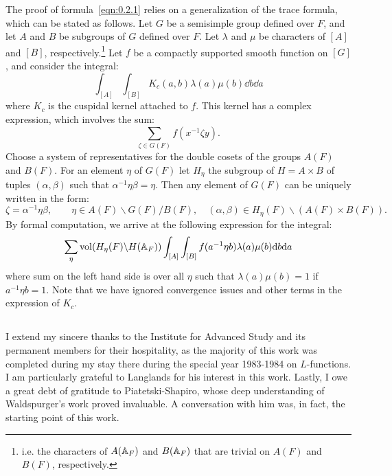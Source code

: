 The proof of formula~\eqref{eqn:0.2.1} relies on a generalization of the trace formula, which can be stated as follows.
Let $G$ be a semisimple group defined over $F$, and let $A$ and $B$ be subgroups of $G$ defined over $F$.
Let $\lambda$ and $\mu$ be characters of $[A]$ and $[B]$, respectively.\footnote{i.e. the characters of $A(\mathbb{A}_F)$ and $B(\mathbb{A}_F)$ that are trivial on $A(F)$ and $B(F)$, respectively.}
Let $f$ be a compactly supported smooth function on $[G]$, and consider the integral:
\[
\int_{[A]} \int_{[B]} K_c(a, b) \lambda(a) \mu(b) \dd b \dd a
\]
where $K_c$ is the cuspidal kernel attached to $f$.
This kernel has a complex expression, which involves the sum:
\[
\sum_{\zeta \in G(F)} f(x^{-1} \zeta y).
\]
Choose a system of representatives for the double cosets of the groups $A(F)$ and $B(F)$.
For an element $\eta$  of $G(F)$ let $H_\eta$ the subgroup of $H = A\times B$ of tuples $(\alpha, \beta)$ such that $\alpha^{-1} \eta \beta = \eta$.
Then any element of $G(F)$ can be uniquely written in the form:
\[
\zeta = \alpha^{-1} \eta \beta, \qquad \eta \in A(F) \backslash G(F) / B(F), \quad (\alpha, \beta) \in H_{\eta}(F) \backslash (A(F) \times B(F)).
\]
By formal computation, we arrive at the following expression for the integral:
\[
\sum_{\eta} \mathrm{vol}(H_{\eta}(F) \backslash H(\mathbb{A}_F)) \int_{[A]} \int_{[B]} f(a^{-1} \eta b) \lambda(a) \mu(b) \mathrm{d} b \mathrm{d} a
\]
where sum on the left hand side is over all $\eta$ such that $\lambda(a) \mu(b) = 1$ if $a^{-1} \eta b = 1$.
Note that we have ignored convergence issues and other terms in the expression of $K_c$.

\subsection{}
I extend my sincere thanks to the Institute for Advanced Study and its permanent members for their hospitality, as the majority of this work was completed during my stay there during the special year 1983-1984 on $L$-functions.
I am particularly grateful to Langlands for his interest in this work.
Lastly, I owe a great debt of gratitude to Piatetski-Shapiro, whose deep understanding of Waldspurger's work proved invaluable.
A conversation with him was, in fact, the starting point of this work.
